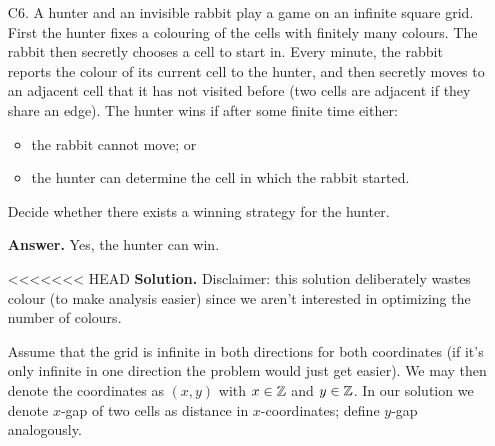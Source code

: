 \documentclass[11pt,a4paper]{article}
\begin{document}
\begin{enumerate}
\begin{proof}
        	Conversely, if we have such a collection of $A\to v_1\Rightarrow v_2\to B$, then these collections have edges disjoint from $A\to v\to B$, so such addition is valid. It therefore means we can pick the collection with maximum number of paths. 
        \end{proof}
        To finish, denote $C_{AB}$ as the quantity described in Lemma \ref{lemma_c4b}. 
        Such paths do not depend on $A$ and $B$ other than that we have in- and out-types of edges, so $C_{AB}=C_{BA}$. 
        Therefore, 
        \[
        N_{AB} = C_{AB} + 1\{A\to B\} + |\{v: \vec{AB}-\text{type}\}|
        \qquad 
        N_{BA} = C_{BA} + 1\{B\to A\} + |\{v: \vec{BA}-\text{type}\}|
        \]
        where $1\{A\to B\}$ means there's a directed edge $A\to B$. 
	    so $N_{AB}-N_{BA} = 1\{A\to B\} + |\{v: \vec{AB}-\text{type}\}| - (1\{B\to A\} + |\{v: \vec{BA}-\text{type}\}|)$. 
	    Given also that the out degree of $A$, $\text{out}(A)$ is given by 
	    $1\{A\to B\} + |\{v: \vec{AB}-\text{type}\}| + |\{v: \text{out-type}\}|$, 
	    we have 
	    \[
	    N_{AB} - N_{BA} = \text{out}(A) - \text{out}(B)
	    \]
	    as desired. 
	    
	    \item [C6.]
	    A hunter and an invisible rabbit play a game on an infinite square grid. First the hunter fixes a colouring of the cells with finitely many colours. The rabbit then secretly chooses a cell to start in. Every minute, the rabbit reports the colour of its current cell to the hunter, and then secretly moves to an adjacent cell that it has not visited before (two cells are adjacent if they share an edge). The hunter wins if after some finite time either:
	    \begin{itemize}
	    	\item the rabbit cannot move; or
	    	
	    	\item the hunter can determine the cell in which the rabbit started.
	    \end{itemize}
	    
	    Decide whether there exists a winning strategy for the hunter.
	    
	    \textbf{Answer.} Yes, the hunter can win. 
	    
<<<<<<< HEAD
	    \textbf{Solution.} 
	    Disclaimer: this solution deliberately wastes colour (to make analysis easier) since we aren't interested in optimizing the number of colours. 
	    
	    Assume that the grid is infinite in both directions for both coordinates 
	    (if it's only infinite in one direction the problem would just get easier). 
	    We may then denote the coordinates as $(x, y)$ with $x\in{\mathbb Z}$ and $y\in{\mathbb Z}$. 
	    In our solution we denote $x$-gap of two cells as distance in $x$-coordinates; 
	    define $y$-gap analogously. 
	    

\end{enumerate}
\end{document}
